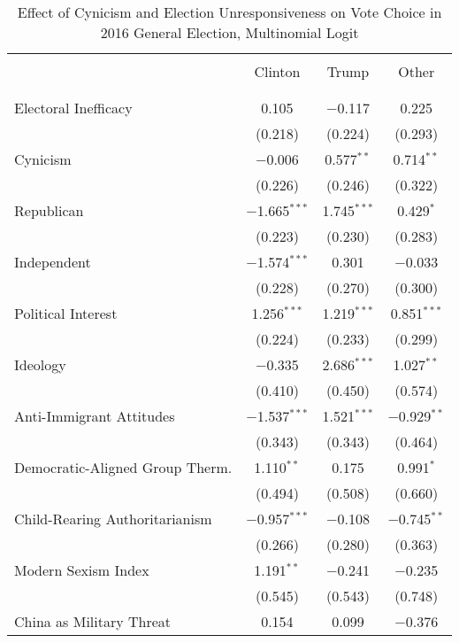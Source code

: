 \documentclass[12pt]{article}
\begin{document}
\begin{appendices}
\begin{refsection}
\begin{table}[!t] \centering 
  \caption{Effect of Cynicism and Election Unresponsiveness on Vote Choice in 2016 General Election, Multinomial Logit} 
  \label{tab:general} 
   \renewcommand{\arraystretch}{1}
\begin{adjustbox}{width=0.6\textwidth,center}
\begin{tabular}{@{\extracolsep{5pt}}lccc} 
\\[-1.8ex]\hline 
 \\[-2ex] 
 & Clinton & Trump & Other \\ 
\hline \\[-1.8ex] 
\hline \\[-1.8ex] 
 Electoral Inefficacy & 0.105 & $-$0.117 & 0.225 \\ 
  & (0.218) & (0.224) & (0.293) \\ 
 Cynicism & $-$0.006 & 0.577$^{**}$ & 0.714$^{**}$ \\ 
  & (0.226) & (0.246) & (0.322) \\ 
 Republican & $-$1.665$^{***}$ & 1.745$^{***}$ & 0.429$^{*}$ \\ 
  & (0.223) & (0.230) & (0.283) \\ 
 Independent & $-$1.574$^{***}$ & 0.301 & $-$0.033 \\ 
  & (0.228) & (0.270) & (0.300) \\ 
 Political Interest & 1.256$^{***}$ & 1.219$^{***}$ & 0.851$^{***}$ \\ 
  & (0.224) & (0.233) & (0.299) \\ 
 Ideology & $-$0.335 & 2.686$^{***}$ & 1.027$^{**}$ \\ 
  & (0.410) & (0.450) & (0.574) \\ 
 Anti-Immigrant Attitudes & $-$1.537$^{***}$ & 1.521$^{***}$ & $-$0.929$^{**}$ \\ 
  & (0.343) & (0.343) & (0.464) \\ 
 Democratic-Aligned Group Therm. & 1.110$^{**}$ & 0.175 & 0.991$^{*}$ \\ 
  & (0.494) & (0.508) & (0.660) \\ 
 Child-Rearing Authoritarianism & $-$0.957$^{***}$ & $-$0.108 & $-$0.745$^{**}$ \\ 
  & (0.266) & (0.280) & (0.363) \\ 
 Modern Sexism Index & 1.191$^{**}$ & $-$0.241 & $-$0.235 \\ 
  & (0.545) & (0.543) & (0.748) \\ 
 China as Military Threat & 0.154 & 0.099 & $-$0.376 \\ 

\end{tabular}
\end{adjustbox}
\end{table}
\end{refsection}
\end{appendices}
\end{document}
